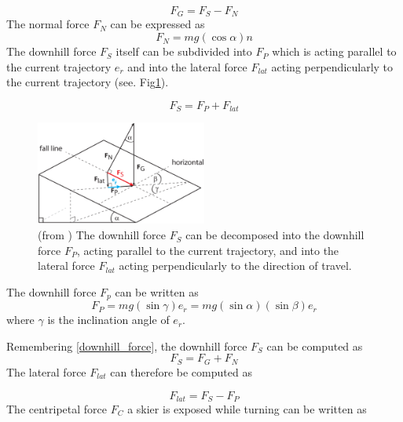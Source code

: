 \documentclass[12pt,a4paper,twoside]{book}
\begin{document}
\begin{equation}\label{downhill_force}
F_G=F_S-F_N
\end{equation}
The normal force $F_N$ can be expressed as
\begin{equation}
F_N=mg(\cos \alpha )n
\end{equation}
The  downhill force $F_S$ itself can be subdivided into $F_P$ which is acting parallel to the current trajectory $e_{\dot{r}}$ and into the lateral force $F_{lat}$ acting perpendicularly to the current trajectory (see. Fig\ref{downhill_force_pic}).

\begin{equation}
F_S=F_P+F_{lat}
\end{equation}
\begin{figure}[!ht]
  \begin{center}
    \includegraphics[width=0.5\textwidth]{images/figure5.eps}
    \caption{(from \cite{hol2012}) The downhill force $F_S$ can be decomposed into the downhill force $F_P$, acting parallel to the current trajectory, and into the lateral force $F_{lat}$ acting perpendicularly to the direction of travel.}\label{downhill_force_pic}
  \end{center}
\end{figure}

The downhill force $F_p$ can be written as
\begin{equation}
F_P=mg ( \sin \gamma ) e_{\dot{r}}=mg ( \sin \alpha ) ( \sin \beta ) e_{\dot{r}}
\end{equation}
where $\gamma$ is the inclination angle of $e_{\dot{r}}$.

Remembering \ref{downhill_force}, the downhill force $F_S$ can be computed as
\begin{equation}
F_S=F_G+F_N
\end{equation}
The lateral force $F_{lat}$ can therefore be computed as

\begin{equation}
F_{lat}=F_S-F_P
\end{equation}
The centripetal force $F_C$ a skier is exposed while turning can be written as
\end{document}
